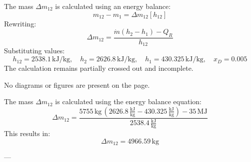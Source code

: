 The mass \( \Delta m_{12} \) is calculated using an energy balance:  
\[
m_{12} - m_{1} = \Delta m_{12} [h_{12}]
\]  
Rewriting:  
\[
\Delta m_{12} = \frac{\dot{m} (h_2 - h_1) - Q_R}{h_{12}}
\]  
Substituting values:  
\[
h_{12} = 2538.1 \, \text{kJ/kg}, \quad h_2 = 2626.8 \, \text{kJ/kg}, \quad h_1 = 430.325 \, \text{kJ/kg}, \quad x_D = 0.005
\]  
The calculation remains partially crossed out and incomplete.  

No diagrams or figures are present on the page.

The mass \( \Delta m_{12} \) is calculated using the energy balance equation:  
\[
\Delta m_{12} = \frac{5755 \, \text{kg} \, (2626.8 \, \frac{\text{kJ}}{\text{kg}} - 430.325 \, \frac{\text{kJ}}{\text{kg}}) - 35 \, \text{MJ}}{2538.4 \, \frac{\text{kJ}}{\text{kg}}}
\]  
This results in:  
\[
\Delta m_{12} = 4966.59 \, \text{kg}
\]

---